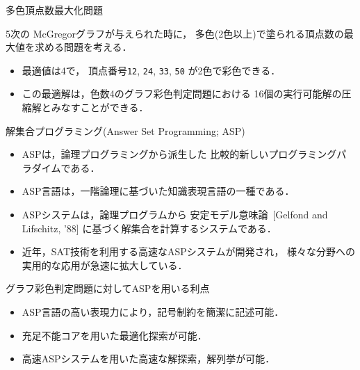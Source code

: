 \documentclass[dvipdfmx,11pt]{beamer}
\newcommand{\code}[1]{\lstinline[basicstyle=\ttfamily]{#1}}
\begin{document}
\begin{frame}{多色頂点数最大化問題}
 \begin{exampleblock}{}
  5次の McGregorグラフが与えられた時に，
  多色(2色以上)で塗られる頂点数の最大値を求める問題を考える．
 \end{exampleblock}

 \begin{itemize}
  \item 最適値は4で，
	頂点番号\code{12}, \code{24}, \code{33}, \code{50}
	が2色で彩色できる．
  \item この最適解は，色数4のグラフ彩色判定問題における
	\alert{16}個の実行可能解の圧縮解とみなすことができる．
 \end{itemize}
\end{frame}

\begin{frame}{解集合プログラミング(Answer Set Programming; ASP)}
 \begin{itemize}
  \item \alert{ASP}は，論理プログラミングから派生した
        比較的新しいプログラミングパラダイムである．
  \item \alert{ASP言語}は，一階論理に基づいた知識表現言語の一種である．
  \item \alert{ASPシステム}は，論理プログラムから
        安定モデル意味論~{\scriptsize[Gelfond and Lifschitz, '88]}
        に基づく解集合を計算するシステムである．
  \item 近年，SAT技術を利用する高速なASPシステムが開発され，
        様々な分野への実用的な応用が急速に拡大している．
 \end{itemize}
 
 \begin{alertblock}{グラフ彩色判定問題に対してASPを用いる利点}
  \begin{itemize}
   \item ASP言語の高い表現力により，記号制約を簡潔に記述可能．
   \item 充足不能コアを用いた最適化探索が可能．%
   \item 高速ASPシステムを用いた高速な解探索，解列挙が可能．
  \end{itemize}
 \end{alertblock}
\end{frame}
\end{document}
